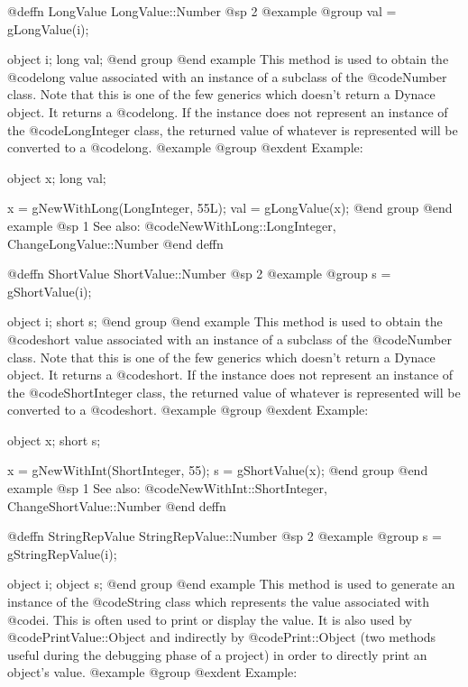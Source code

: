 @deffn {LongValue} LongValue::Number
@sp 2
@example
@group
val = gLongValue(i);

object  i;
long    val;
@end group
@end example
This method is used to obtain the @code{long} value associated
with an instance of a subclass of the @code{Number} class.  Note that
this is one of the few generics which doesn't return a Dynace object.
It returns a @code{long}.  If the instance does not represent
an instance of the @code{LongInteger} class, the returned value
of whatever is represented will be converted to a @code{long}.
@example
@group
@exdent Example:

object  x;
long    val;

x = gNewWithLong(LongInteger, 55L);
val = gLongValue(x);
@end group
@end example
@sp 1
See also:  @code{NewWithLong::LongInteger, ChangeLongValue::Number}
@end deffn










@deffn {ShortValue} ShortValue::Number
@sp 2
@example
@group
s = gShortValue(i);

object  i;
short   s;
@end group
@end example
This method is used to obtain the @code{short} value associated with an
instance of a subclass of the @code{Number} class.  Note that this is
one of the few generics which doesn't return a Dynace object.  It
returns a @code{short}.  If the instance does not represent an instance
of the @code{ShortInteger} class, the returned value of whatever is
represented will be converted to a @code{short}.
@example
@group
@exdent Example:

object  x;
short   s;

x = gNewWithInt(ShortInteger, 55);
s = gShortValue(x);
@end group
@end example
@sp 1
See also:  @code{NewWithInt::ShortInteger, ChangeShortValue::Number}
@end deffn












@deffn {StringRepValue} StringRepValue::Number
@sp 2
@example
@group
s = gStringRepValue(i);

object  i;
object  s;
@end group
@end example
This method is used to generate an instance of the @code{String} class
which represents the value associated with @code{i}.  This is often
used to print or display the value.  It is also used by
@code{PrintValue::Object} and indirectly by @code{Print::Object}
(two methods useful during the debugging phase of a project)
in order to directly print an object's value.
@example
@group
@exdent Example:


